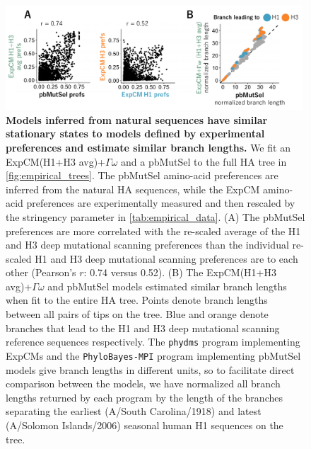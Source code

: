 \documentclass[11pt]{article}
\begin{document}
\begin{figure}
\centerline{\includegraphics[width=0.99\textwidth]{figures/phylobayes.pdf}}
\caption{\label{fig:phylobayes}
\textbf{Models inferred from natural sequences have similar stationary states to models defined by experimental preferences and estimate similar branch lengths.}
We fit an ExpCM(H1+H3 avg)+$\Gamma\omega$ and a pbMutSel to the full HA tree in \ref{fig:empirical_trees}. 
The pbMutSel amino-acid preferences are inferred from the natural HA sequences, while the ExpCM amino-acid preferences are experimentally measured and then rescaled by the stringency parameter in \ref{tab:empirical_data}. 
(A) The pbMutSel preferences are more correlated with the re-scaled average of the H1 and H3 deep mutational scanning preferences than the individual re-scaled H1 and H3 deep mutational scanning preferences are to each other (Pearson's $r$: 0.74 versus 0.52). 
(B) The ExpCM(H1+H3 avg)+$\Gamma\omega$ and pbMutSel models estimated similar branch lengths when fit to the entire HA tree. 
Points denote branch lengths between all pairs of tips on the tree. 
Blue and orange denote branches that lead to the H1 and H3 deep mutational scanning reference sequences respectively. 
The \texttt{phydms} program implementing ExpCMs and the \texttt{PhyloBayes-MPI} program implementing pbMutSel models give branch lengths in different units, so to facilitate direct comparison between the models, we have normalized all branch lengths returned by each program by the length of the branches separating the earliest (A/South Carolina/1918) and latest (A/Solomon Islands/2006) seasonal human H1 sequences on the tree. 
}
\end{figure}
\end{document}
